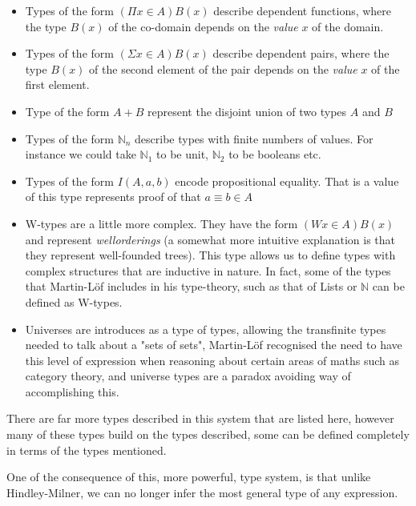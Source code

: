 \documentclass{ProgressReport}[2020/09/15]
\begin{document}
          \begin{itemize}
          \item Types of the form $( \Pi x \in A ) B(x)$ describe
            dependent functions, where the type $B(x)$ of the co-domain
            depends on the \emph{value} $x$ of the domain.
          \item Types of the form $( \Sigma x \in A ) B(x)$ describe
            dependent pairs, where the type $B(x)$ of the second
            element of the pair depends on the \emph{value} $x$ of the
            first element.
          \item Type of the form $A + B$ represent the disjoint union
            of two types $A$ and $B$
          \item Types of the form $\mathbb{N}_n$ describe types
            with finite numbers of values. For instance we could take
            $\mathbb{N}_1$ to be unit, $\mathbb{N}_2$ to be booleans
            etc.
          \item Types of the form $I (A , a , b)$ encode propositional
            equality. That is a value of this type represents proof
            of that $a \equiv b \in A$
          \item W-types are a little more complex. They have the form
            $( W x \in A ) B(x)$ and represent \emph{wellorderings} (a
            somewhat more intuitive explanation is that they represent
            well-founded trees). This type allows us to define types
            with complex structures that are inductive in nature. In fact,
            some of the types that Martin-Löf includes in his
            type-theory, such as that of Lists or $\mathbb{N}$ can be
            defined as W-types.
          \item Universes are introduces as a type of types, allowing
            the transfinite types needed to talk about a "sets of
            sets", Martin-Löf recognised the need to have this level
            of expression when reasoning about certain areas of maths
            such as category theory, and universe types are a paradox
            avoiding way of accomplishing this.
          \end{itemize}

          There are far more types described in this system that are
          listed here, however many of these types build on the types
          described, some can be defined completely in terms of the
          types mentioned.

          One of the consequence of this, more powerful, type system,
          is that unlike Hindley-Milner, we can no longer infer the
          most general type of any expression.
\end{document}
